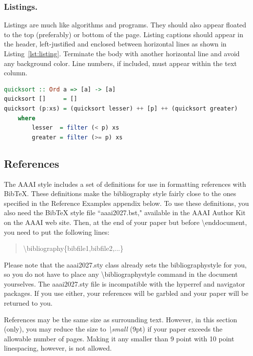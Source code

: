 \subsubsection{Listings.}
Listings are much like algorithms and programs. They should also appear floated to the top (preferably) or bottom of the page. Listing captions should appear in the header, left-justified and enclosed between horizontal lines as shown in Listing~\ref{lst:listing}. Terminate the body with another horizontal line and avoid any background color. Line numbers, if included, must appear within the text column.

\begin{listing}[tb]%
\caption{Example listing {\tt quicksort.hs}}%
\label{lst:listing}%
\begin{lstlisting}[language=Haskell]
quicksort :: Ord a => [a] -> [a]
quicksort []     = []
quicksort (p:xs) = (quicksort lesser) ++ [p] ++ (quicksort greater)
	where
		lesser  = filter (< p) xs
		greater = filter (>= p) xs
\end{lstlisting}
\end{listing}

\subsection{References}
The AAAI style includes a set of definitions for use in formatting references with BibTeX. These definitions make the bibliography style fairly close to the ones  specified in the Reference Examples appendix below. To use these definitions, you also need the BibTeX style file ``aaai2027.bst," available in the AAAI Author Kit on the AAAI web site. Then, at the end of your paper but before \textbackslash end{document}, you need to put the following lines:

\begin{quote}
\begin{small}
\textbackslash bibliography\{bibfile1,bibfile2,...\}
\end{small}
\end{quote}

Please note that the aaai2027.sty class already sets the bibliographystyle for you, so you do not have to place any \textbackslash bibliographystyle command in the document yourselves. The aaai2027.sty file is incompatible with the hyperref and navigator packages. If you use either, your references will be garbled and your paper will be returned to you.

References may be the same size as surrounding text.
However, in this section (only), you may reduce the size to {\em \textbackslash small} (9pt) if your paper exceeds the allowable number of pages. Making it any smaller than 9 point with 10 point linespacing, however, is not allowed.

